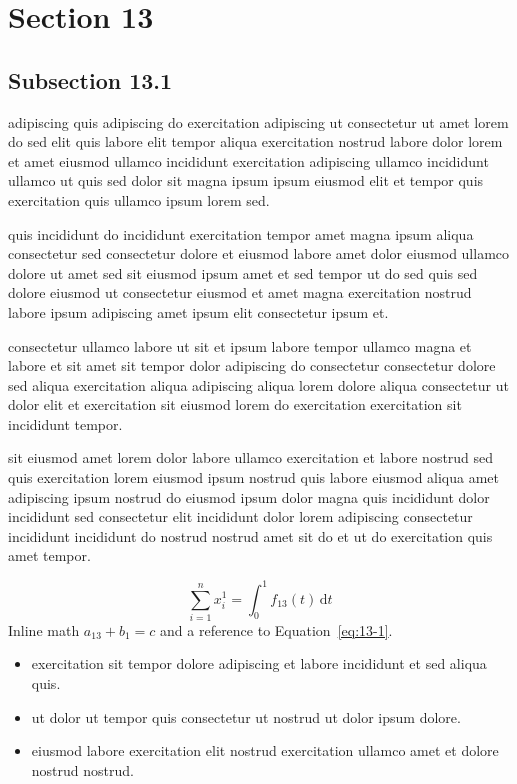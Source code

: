 \documentclass{article}
\begin{document}
\section{Section 13}\label{sec:13}
\subsection{Subsection 13.1}\label{sec:13-1}
adipiscing quis adipiscing do exercitation adipiscing ut consectetur ut amet lorem do sed elit quis labore elit tempor aliqua exercitation nostrud labore dolor lorem et amet eiusmod ullamco incididunt exercitation adipiscing ullamco incididunt ullamco ut quis sed dolor sit magna ipsum ipsum eiusmod elit et tempor quis exercitation quis ullamco ipsum lorem sed.

quis incididunt do incididunt exercitation tempor amet magna ipsum aliqua consectetur sed consectetur dolore et eiusmod labore amet dolor eiusmod ullamco dolore ut amet sed sit eiusmod ipsum amet et sed tempor ut do sed quis sed dolore eiusmod ut consectetur eiusmod et amet magna exercitation nostrud labore ipsum adipiscing amet ipsum elit consectetur ipsum et.

consectetur ullamco labore ut sit et ipsum labore tempor ullamco magna et labore et sit amet sit tempor dolor adipiscing do consectetur consectetur dolore sed aliqua exercitation aliqua adipiscing aliqua lorem dolore aliqua consectetur ut dolor elit et exercitation sit eiusmod lorem do exercitation exercitation sit incididunt tempor.

sit eiusmod amet lorem dolor labore ullamco exercitation et labore nostrud sed quis exercitation lorem eiusmod ipsum nostrud quis labore eiusmod aliqua amet adipiscing ipsum nostrud do eiusmod ipsum dolor magna quis incididunt dolor incididunt sed consectetur elit incididunt dolor lorem adipiscing consectetur incididunt incididunt do nostrud nostrud amet sit do et ut do exercitation quis amet tempor.

\begin{equation}\label{eq:13-1}
  \sum_{i=1}^{n} x_i^{1} = \int_0^1 f_{13}(t)\,\mathrm{d}t
\end{equation}
Inline math $a_{13} + b_{1} = c$ and a reference to Equation~\eqref{eq:13-1}.

\begin{itemize}
  \item exercitation sit tempor dolore adipiscing et labore incididunt et sed aliqua quis.
  \item ut dolor ut tempor quis consectetur ut nostrud ut dolor ipsum dolore.
  \item eiusmod labore exercitation elit nostrud exercitation ullamco amet et dolore nostrud nostrud.
\end{itemize}
\end{document}
